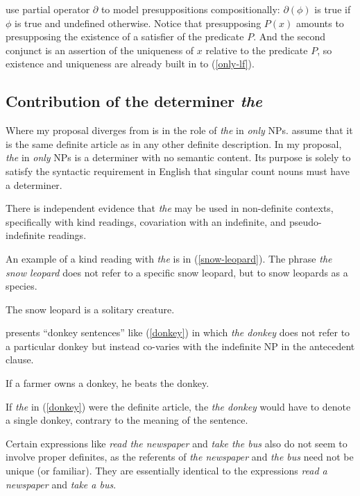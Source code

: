 \citeauthor{cb2015} use  partial operator $\partial$ to model presuppositions compositionally: $\partial(\phi)$ is true if $\phi$ is true and undefined otherwise. Notice that presupposing $P(x)$ amounts to presupposing the existence of a satisfier of the predicate $P$. And the second conjunct is an assertion of the uniqueness of $x$ relative to the predicate $P$, so existence and uniqueness are already built in to (\ref{only-lf}).

\subsection{Contribution of the determiner \textit{the}}
Where my proposal diverges from  is in the role of \textit{the} in \textit{only} NPs. \citeauthor{cb2015} assume that it is the same definite article as in any other definite description. In my proposal, \textit{the} in \textit{only} NPs is a determiner with no semantic content. Its purpose is solely to satisfy the syntactic requirement in English that singular count nouns must have a determiner.

There is independent evidence that \textit{the} may be used in non-definite contexts, specifically with kind readings, covariation with an indefinite, and pseudo-indefinite readings.

An example of a kind reading with \textit{the} is in (\ref{snow-leopard}). The phrase \textit{the snow leopard} does not refer to a specific snow leopard, but to snow leopards as a species.

\begin{exe}
	\ex \label{snow-leopard} The snow leopard is a solitary creature.
\end{exe}

\citet{schwarz09} presents ``donkey sentences'' like (\ref{donkey}) in which \textit{the donkey} does not refer to a particular donkey but instead co-varies with the indefinite NP in the antecedent clause.

\begin{exe}
	\ex \label{donkey} If a farmer owns a donkey, he beats the donkey.
\end{exe}

If \textit{the} in (\ref{donkey}) were the definite article, the \textit{the donkey} would have to denote a single donkey, contrary to the meaning of the sentence.

Certain expressions like \textit{read the newspaper} and \textit{take the bus} also do not seem to involve proper definites, as the referents of \textit{the newspaper} and \textit{the bus} need not be unique (or familiar). They are essentially identical to the expressions \textit{read a newspaper} and \textit{take a bus}.

